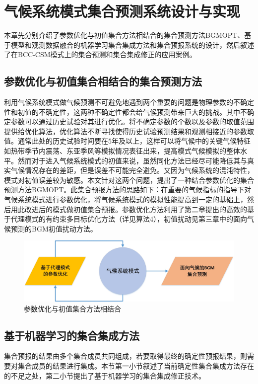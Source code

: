 \chapter{气候系统模式集合预测系统设计与实现}
\label{cha:intro}
本章先分别介绍了参数优化与初值集合方法相结合的集合预测方法BGMOPT、基于模型和观测数据融合的机器学习集合集成方法和集合预报系统的设计，然后叙述了在BCC-CSM模式上的集合预测和集合集成修正的应用案例。
\section{参数优化与初值集合相结合的集合预测方法}
利用气候系统模式做气候预测不可避免地遇到两个重要的问题是物理参数的不确定性和初值的不确定性，这两种不确定性都会给气候预测带来巨大的挑战。其中不确定参数可以通过历史试验对其进行优化。将不确定参数的个数以及参数的取值范围提供给优化算法，优化算法不断寻找使得历史试验预测结果和观测相接近的参数取值。通常此处的历史试验时间要在5年及以上，这样可以将气候中的关键气候特征如热带季节内震荡、东亚季风等模拟情况表征出来，提高模式气候模拟的整体水平。然而对于进入气候系统模式的初值来说，虽然同化方法已经尽可能降低其与真实气候情况存在的差距，但是误差不可能完全避免。又因为气候系统的混沌特性，模式对初值误差较为敏感。本文针对这两个问题，提出了一种结合参数优化的集合预测方法BGMOPT。此集合预报方法的思路如下：在重要的气候指标的指导下对气候系统模式进行参数优化，将气候系统模式的模拟性能提高到一定的基础上，然后用此改进后的模式做初值集合预报。参数优化方法利用了第二章提出的高效的基于代理模式的有约束多目标优化方法（详见算法4），初值扰动见第三章中的面向气候预测的BGM初值扰动方法。
\begin{figure}[H] %
  \centering
  \includegraphics[scale=0.6]{figures/参数优化+初值集合.jpg}
  \caption{参数优化与初值集合方法相结合}
  \label{fig:xfig1}
\end{figure} 
\section{基于机器学习的集合集成方法}
集合预报的结果由多个集合成员共同组成，若要取得最终的确定性预报结果，则需要对集合成员的结果进行集成。本节第一小节叙述了当前确定性集合集成方法存在的不足之处，第二小节提出了基于机器学习的集合集成修正技术。
